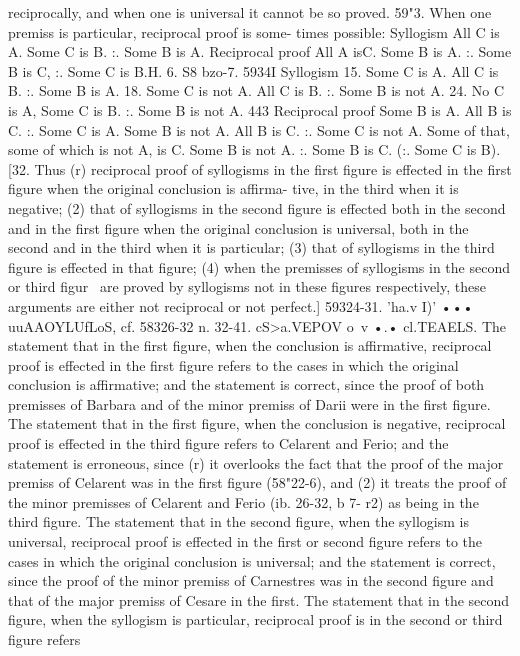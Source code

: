 {{reciprocally, and when one is universal it cannot be so proved.
59"3. When one premiss is particular, reciprocal proof is some-
times possible:
Syllogism
All C is A.
Some C is B.
:. Some B is A.
Reciprocal proof
All A isC.
Some B is A.
:. Some B is C, :. Some C is B.H. 6. S8 bzo-7. 5934I
Syllogism
15.
Some C is A.
All C is B.
:. Some B is A.
18.
Some C is not A.
All C is B.
:. Some B is not A.
24.
No C is A,
Some C is B.
:. Some B is not A.
443
Reciprocal proof
Some B is A.
All B is C.
:. Some C is A.
Some B is not A.
All B is C.
:. Some C is not A.
Some of that, some of which is not A, is C.
Some B is not A.
:. Some B is C.
(:. Some C is B).
[32. Thus (r) reciprocal proof of syllogisms in the first figure is
effected in the first figure when the original conclusion is affirma-
tive, in the third when it is negative; (2) that of syllogisms in the
second figure is effected both in the second and in the first figure
when the original conclusion is universal, both in the second and
in the third when it is particular; (3) that of syllogisms in the
third figure is effected in that figure; (4) when the premisses of
syllogisms in the second or third figur~ are proved by syllogisms
not in these figures respectively, these arguments are either not
reciprocal or not perfect.]
59324-31. 'ha.v I)' ••• uuAAOYLUfLoS, cf. 58326-32 n.
32-41. cS>a.VEPOV o~v •.• cl.TEAELS. The statement that in the
first figure, when the conclusion is affirmative, reciprocal proof is
effected in the first figure refers to the cases in which the original
conclusion is affirmative; and the statement is correct, since the
proof of both premisses of Barbara and of the minor premiss of
Darii were in the first figure. The statement that in the first
figure, when the conclusion is negative, reciprocal proof is effected
in the third figure refers to Celarent and Ferio; and the statement
is erroneous, since (r) it overlooks the fact that the proof of the
major premiss of Celarent was in the first figure (58"22-6), and (2)
it treats the proof of the minor premisses of Celarent and Ferio
(ib. 26-32, b 7- r2) as being in the third figure. The statement that
in the second figure, when the syllogism is universal, reciprocal
proof is effected in the first or second figure refers to the cases in
which the original conclusion is universal; and the statement is
correct, since the proof of the minor premiss of Carnestres was in
the second figure and that of the major premiss of Cesare in the
first. The statement that in the second figure, when the syllogism
is particular, reciprocal proof is in the second or third figure refers
}}
